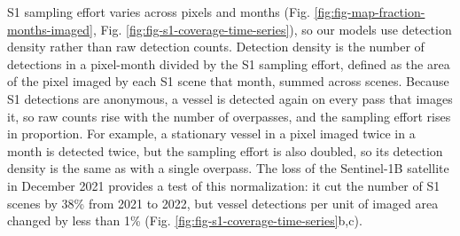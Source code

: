 \documentclass[lineno,pdflatex,sn-nature]{sn-jnl}
\begin{document}
S1 sampling effort varies across pixels and months (Fig. \ref{fig:fig-map-fraction-months-imaged}, Fig. \ref{fig:fig-s1-coverage-time-series}), so our models use detection density rather than raw detection counts. Detection density is the number of detections in a pixel-month divided by the S1 sampling effort, defined as the area of the pixel imaged by each S1 scene that month, summed across scenes. Because S1 detections are anonymous, a vessel is detected again on every pass that images it, so raw counts rise with the number of overpasses, and the sampling effort rises in proportion. For example, a stationary vessel in a pixel imaged twice in a month is detected twice, but the sampling effort is also doubled, so its detection density is the same as with a single overpass. The loss of the Sentinel-1B satellite in December 2021 provides a test of this normalization: it cut the number of S1 scenes by 38\% from 2021 to 2022, but vessel detections per unit of imaged area changed by less than 1\% (Fig. \ref{fig:fig-s1-coverage-time-series}b,c).
\end{document}
